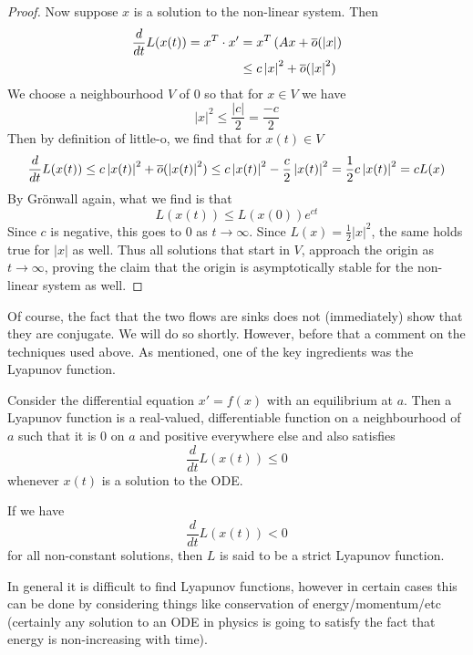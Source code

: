 \begin{proof}
Now suppose $x$ is a solution to the non-linear system. Then
\begin{align*}
    \frac{d}{dt} L(x(t)) = x^{T} \cdot x' &= x^{T} \left( Ax + \overline{o}(\left| x\right| \right)\\
    &\leq c \left| x \right|^2 + \overline{o}(\left| x \right|^2)
\end{align*}
We choose a neighbourhood $V$ of 0 so that for $x \in V$ we have
$$ |x|^2 \leq \frac{|c|}{2} = \frac{-c}{2} $$
Then by definition of little-o, we find that for $x(t) \in V$
\begin{align*}
    \frac{d}{dt} L(x(t)) \leq c \left|x(t) \right|^2 + \overline{o}(\left|x(t)\right|^2) \leq c \left|x(t) \right|^2 - \frac{c}{2} \left|x(t) \right|^2 = \frac{1}{2} c \left|x(t) \right|^2 = c L(x)
\end{align*}
By Grönwall again, what we find is that 
$$ L(x(t)) \leq L(x(0)) e^{ct} $$
Since $c$ is negative, this goes to 0 as $t \to \infty$. Since $L(x) = \frac{1}{2}|x|^2$, the same holds true for $|x|$ as well. Thus all solutions that start in $V$, approach the origin as $t \to \infty$, proving the claim that the origin is asymptotically stable for the non-linear system as well.
\end{proof}
Of course, the fact that the two flows are sinks does not (immediately) show that they are conjugate. We will do so shortly. However, before that a comment on the techniques used above. As mentioned, one of the key ingredients was the Lyapunov function.

\begin{definition}
Consider the differential equation $x' = f(x)$ with an equilibrium at $a$. Then a Lyapunov function is a real-valued, differentiable function on a neighbourhood of $a$ such that it is 0 on $a$ and positive everywhere else and also satisfies
$$ \frac{d}{dt} L(x(t)) \leq 0 $$
whenever $x(t)$ is a solution to the ODE.

If we have 
$$ \frac{d}{dt} L(x(t)) < 0 $$
for all non-constant solutions, then $L$ is said to be a strict Lyapunov function.
\end{definition}

In general it is difficult to find Lyapunov functions, however in certain cases this can be done by considering things like conservation of energy/momentum/etc (certainly any solution to an ODE in physics is going to satisfy the fact that energy is non-increasing with time).